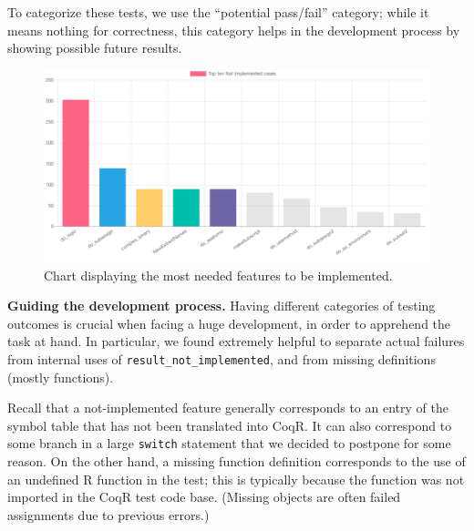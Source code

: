 \documentclass[
    sigplan,
    10pt,
    review, %
    natbib=false %
 ]{acmart}
\newcommand\td[1]{\todo[color=green!20,size=\scriptsize]{#1}}
\newcommand\CoqR{CoqR}
\begin{document}
%
%
To categorize these tests,
we use the ``potential pass/fail'' category; while it means nothing for correctness, this category helps in the development process by showing possible future results.\\


\begin{figure}
    \includegraphics[width=.5\textwidth]{not_implemented_fastr.png}
\vspace{-2em}
    \caption{Chart displaying the most needed features to be implemented.}
    \label{fig:library:not_implemented_fastr}
\end{figure}

\noindent\textbf{Guiding the development process.}
Having different categories of testing outcomes is crucial when facing a huge development, in order to apprehend the task at hand. In particular, we found extremely helpful to separate actual failures from internal uses of \texttt{result_not_implemented}, and from missing definitions (mostly functions).

Recall that a not-implemented feature generally corresponds to an entry of the symbol table that has not been translated into \CoqR{}. It can also correspond to some branch in a large \texttt{switch} statement that we decided to postpone for some reason. On the other hand, a missing function definition corresponds to the use of an undefined R function in the test; this is typically because the function was not imported in the \CoqR{} test code base. (Missing objects are often failed assignments due to previous errors.)
\end{document}
